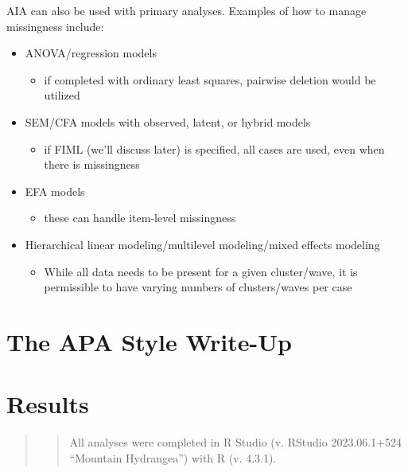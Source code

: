 \documentclass[
  11pt,
]{book}
\providecommand{\tightlist}{%
  \setlength{\itemsep}{0pt}\setlength{\parskip}{0pt}}
\begin{document}
AIA can also be used with primary analyses. Examples of how to manage missingness include:

\begin{itemize}
\tightlist
\item
  ANOVA/regression models

  \begin{itemize}
  \tightlist
  \item
    if completed with ordinary least squares, pairwise deletion would be utilized
  \end{itemize}
\item
  SEM/CFA models with observed, latent, or hybrid models

  \begin{itemize}
  \tightlist
  \item
    if FIML (we'll discuss later) is specified, all cases are used, even when there is missingness
  \end{itemize}
\item
  EFA models

  \begin{itemize}
  \tightlist
  \item
    these can handle item-level missingness
  \end{itemize}
\item
  Hierarchical linear modeling/multilevel modeling/mixed effects modeling

  \begin{itemize}
  \tightlist
  \item
    While all data needs to be present for a given cluster/wave, it is permissible to have varying numbers of clusters/waves per case
  \end{itemize}
\end{itemize}

\hypertarget{the-apa-style-write-up}{%
\section{The APA Style Write-Up}\label{the-apa-style-write-up}}

\hypertarget{results}{%
\section{Results}\label{results}}

\begin{quote}
\begin{quote}
All analyses were completed in R Studio (v. RStudio 2023.06.1+524 ``Mountain Hydrangea'') with R (v. 4.3.1).
\end{quote}
\end{quote}
\end{document}
